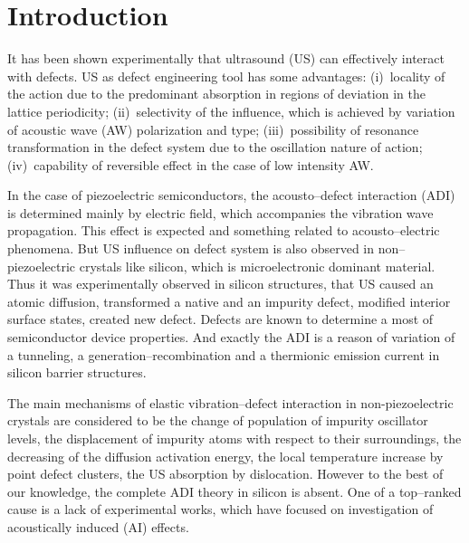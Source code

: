 \documentclass[aip,jap, amsmath,amssymb,reprint]{revtex4-1}
\begin{document}
\section{Introduction}
It has been shown experimentally that ultrasound (US) can effectively interact with defects.
US as defect engineering tool has some advantages:
(i)~locality of the action due to the predominant absorption in regions of deviation in the lattice periodicity;
(ii)~selectivity of the influence, which is achieved by variation of acoustic wave (AW) polarization and type;
(iii)~possibility of resonance transformation in the defect system due to the oscillation nature of action;
(iv)~capability of reversible effect in the case of low intensity AW.

In the case of piezoelectric semiconductors, the acousto--defect interaction (ADI) is determined mainly by electric field, which accompanies the vibration wave propagation.
This effect is expected and something related to acousto--electric phenomena.
But US influence on defect system is also observed in non--piezoelectric crystals like silicon, which is microelectronic dominant material.
Thus it was experimentally observed in silicon structures, that US
caused an atomic diffusion, \cite{Roman:2010JAP,Roman:2007APL}
transformed a native and an impurity defect, \cite{Ostapenko1994,Korotchenkov1995,Olikh2009Sem,Ostapenko1995,Ostrovskii2001}
modified  interior surface states,\cite{UST:Medvid,Zaver:2008,Mirsagatov}
created new defect. \cite{Savkina2015,Virot}
Defects are known to determine a most of semiconductor device properties.
And exactly the ADI is a reason of variation of a tunneling, \cite{Olikh2016JSem,Olikh2011Sem} a generation--recombination \cite{Davletova2009,Davletova2008,YOlikh2005} and  a thermionic emission \cite{OlikhJAP,Olikh:Ultras} current in silicon barrier structures.

The main mechanisms of elastic vibration--defect interaction in non-piezoelectric crystals are considered to be
the  change  of  population  of  impurity  oscillator  levels,  \cite{Pavlovich}
the displacement of impurity atoms with respect to their surroundings, \cite{Korotchenkov1995,MirzadeJAP2011,PeleshchakUJF2016}
the decreasing of the diffusion activation  energy, \cite{Krevchik}
the local temperature increase by point defect clusters, \cite{MirzadeJAP2005}
the US absorption by dislocation. \cite{Davletova2008,OstrovKor92,Olikh:Ultras2016}
However to the best of our knowledge, the complete ADI theory in silicon is absent.
One of a top--ranked cause
is a lack of experimental works, which have focused on investigation of acoustically induced (AI) effects.
\end{document}
